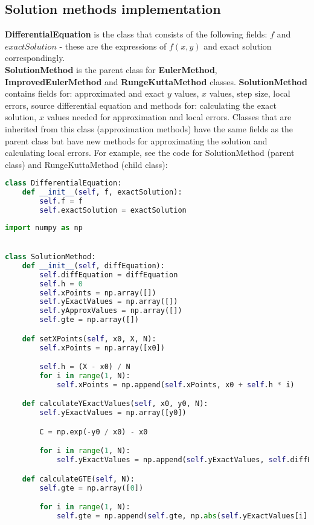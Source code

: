 \documentclass[12pt, a4paper]{article}
\begin{document}
    \subsection{Solution methods implementation}
        \textbf{DifferentialEquation} is the class that consists of the following fields: $f$ and $exactSolution$ - these are the expressions of $f(x, y)$ and exact solution correspondingly. \\
        \textbf{SolutionMethod} is the parent class for \textbf{EulerMethod}, \textbf{ImprovedEulerMethod} and \textbf{RungeKuttaMethod} classes. \textbf{SolutionMethod} contains fields for: approximated and exact $y$ values, $x$ values, step size, local errors, source differential equation and methods for: calculating the exact solution, $x$ values needed for approximation and local errors. Classes that are inherited from this class (approximation methods) have the same fields as the parent class but have new methods for approximating the solution and calculating local errors. For example, see the code for SolutionMethod (parent class) and RungeKuttaMethod (child class):
        
        \begin{lstlisting}[language=Python, caption=DifferentialEquation class]
class DifferentialEquation:
    def __init__(self, f, exactSolution):
        self.f = f
        self.exactSolution = exactSolution
    \end{lstlisting}
        
        \begin{lstlisting}[language=Python, caption=SolutionMethod class]
import numpy as np


class SolutionMethod:
    def __init__(self, diffEquation):
        self.diffEquation = diffEquation
        self.h = 0
        self.xPoints = np.array([])
        self.yExactValues = np.array([])
        self.yApproxValues = np.array([])
        self.gte = np.array([])

    def setXPoints(self, x0, X, N):
        self.xPoints = np.array([x0])

        self.h = (X - x0) / N
        for i in range(1, N):
            self.xPoints = np.append(self.xPoints, x0 + self.h * i)

    def calculateYExactValues(self, x0, y0, N):
        self.yExactValues = np.array([y0])

        C = np.exp(-y0 / x0) - x0

        for i in range(1, N):
            self.yExactValues = np.append(self.yExactValues, self.diffEquation.exactSolution(self.xPoints[i], C))

    def calculateGTE(self, N):
        self.gte = np.array([0])

        for i in range(1, N):
            self.gte = np.append(self.gte, np.abs(self.yExactValues[i] - self.yApproxValues[i]))
    \end{lstlisting}
    
\end{document}
